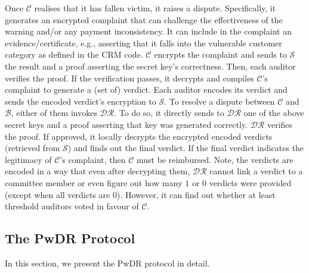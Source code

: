 

Once $\mathcal{C}$ realises that it has fallen victim, it raises a dispute. Specifically, it generates an encrypted complaint that can challenge the effectiveness of the warning and/or any payment inconsistency. It can include in the complaint an evidence/certificate, e.g., asserting that it falls into the vulnerable customer category as defined in the CRM code. $\mathcal{C}$ encrypts the complaint and sends to $\mathcal{S}$ the result and a proof asserting the secret key's correctness.  Then, each auditor verifies the proof. If the verification passes, it decrypts and compiles $\mathcal{C}$'s complaint to generate a (set of) verdict. Each auditor encodes its verdict and sends the encoded verdict's encryption to $\mathcal{S}$. To resolve a dispute between $\mathcal{C}$ and $\mathcal{B}$, either of them invokes $\mathcal{DR}$. To do so, it directly sends to $\mathcal{DR}$ one of the above secret keys and a proof asserting that key was generated correctly.   $\mathcal{DR}$ verifies the proof. If approved, it locally decrypts the encrypted encoded verdicts (retrieved from $\mathcal{S}$) and finds out the final verdict.  If the final verdict indicates the legitimacy of  $\mathcal{C}$'s complaint, then $\mathcal{C}$ must be reimbursed.   Note, the verdicts are encoded in a way that even after decrypting them, $\mathcal{DR}$ cannot link a verdict to a committee member or even figure out how many $1$ or $0$ verdicts were provided  (except when all verdicts are $0$). However, it can find out whether at least threshold auditors voted in favour of $\mathcal{C}$. %










\subsection{The PwDR Protocol}\label{sec::PwDR-auditorprotocol}
\vspace{-1mm}
In this section, we present the PwDR protocol in detail. 


